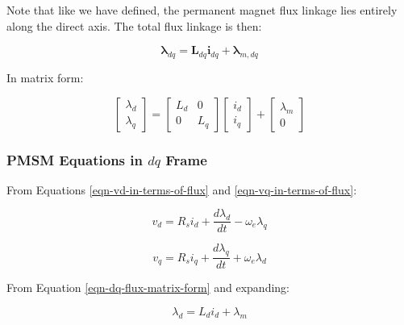 \documentclass{article}
\begin{document}
Note that like we have defined, the permanent magnet flux linkage lies entirely along the direct axis. The total flux linkage is then:

\begin{equation}
    \boldsymbol{\lambda}_{dq} = \mathbf{L}_{dq}\mathbf{i}_{dq} + \boldsymbol{\lambda}_{m,dq}
\end{equation}

In matrix form:

\begin{equation}
\label{eqn-dq-flux-matrix-form}
    \begin{bmatrix}
        \lambda_d \\
        \lambda_q
    \end{bmatrix}
    =
    \begin{bmatrix}
        L_d & 0 \\
        0 & L_q
    \end{bmatrix}
    \begin{bmatrix}
        i_d \\
        i_q
    \end{bmatrix}
    +
    \begin{bmatrix}
        \lambda_m \\
        0
    \end{bmatrix}
\end{equation}

\subsubsection{PMSM Equations in \texorpdfstring{$dq$}{dq} Frame}


From Equations \ref{eqn-vd-in-terms-of-flux} and \ref{eqn-vq-in-terms-of-flux}:

\begin{equation}
    v_d = R_si_d + \frac{d\lambda_d}{dt} - \omega_e\lambda_q
\end{equation}

\begin{equation}
    v_q = R_si_q + \frac{d\lambda_q}{dt} + \omega_e\lambda_d
\end{equation}

From Equation \ref{eqn-dq-flux-matrix-form} and expanding:

\begin{equation}
    \lambda_d = L_d i_d + \lambda_m
\end{equation}
\end{document}
